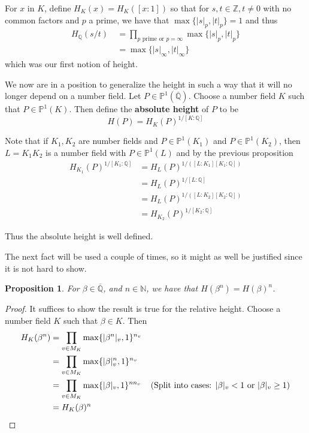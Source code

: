\documentclass[12pt]{amsart}
\newtheorem{prop}[thm]{Proposition}
\theoremstyle{definition}
\theoremstyle{remark}
\theoremstyle{definition}
\newcommand{\N}{\mathbb{N}}
\newcommand{\Z}{\mathbb{Z}}
\newcommand{\Q}{\mathbb{Q}}
\renewcommand{\P}{\mathbb{P}}
\begin{document}
For $x$ in $K$, define $H_K(x) = H_K([x:1])$ so that for $s,t \in \Z, t \neq 0$ with no common factors and $p$ a prime, we have that $\max\{|s|_p,|t|_p\} = 1$ and thus 
\begin{align*}
H_\Q(s/t) \
&= \prod_{p \text{ prime or } p = \infty}\max\{|s|_p,|t|_p\}\\
&= \max\{|s|_\infty,|t|_\infty\}
\end{align*} 
which was our first notion of height.

We now are in a position to generalize the height in such a way that it will no longer depend on a number field. Let $P \in \P^1(\overline{\Q})$. Choose a number field $K$ such that $P \in \P^1(K)$. Then define the \textbf{absolute height} of $P$ to be $$H(P) = H_K(P)^{1/[K:\Q]}$$

Note that if $K_1,K_2$ are number fields and $P \in \P^1(K_1)$ and $P \in \P^1(K_2)$, then $L = K_1K_2$ is a number field with $P \in \P^1(L)$ and by the previous proposition
\begin{align*}
H_{K_1}(P)^{1/[K_1:\Q]} 
&= H_L(P)^{1/([L:K_1][K_1:\Q])}\\
&= H_L(P)^{1/[L:\Q]}\\
&= H_L(P)^{1/([L:K_2][K_2:\Q])}\\
&= H_{K_2}(P)^{1/[K_2:\Q]}
\end{align*}

\noindent Thus the absolute height is well defined. 

The next fact will be used a couple of times, so it might as well be justified since it is not hard to show.

\begin{prop}
For $\beta \in \overline{\Q}$, and $n \in \N$, we have that $H(\beta^n) = H(\beta)^n$.

\end{prop}

\begin{proof}
It suffices to show the result is true for the relative height. Choose a number field $K$ such that $\beta \in K$. Then \begin{align*}
H_K(\beta^n) 
&= \prod_{v \in M_K}\max\{|\beta^n|_{v}, 1\}^{n_{v}}\\
&= \prod_{v \in M_K}\max\{|\beta|_{v}^n, 1\}^{n_{v}}\\
&= \prod_{v \in M_K}\max\{|\beta|_{v}, 1\}^{nn_{v}} \hspace{4mm} (\text{Split into cases: }|\beta|_{v} < 1 \text{ or }|\beta|_{v} \geq 1)\\
&= H_K(\beta)^n
\end{align*}
\end{proof}
\end{document}
